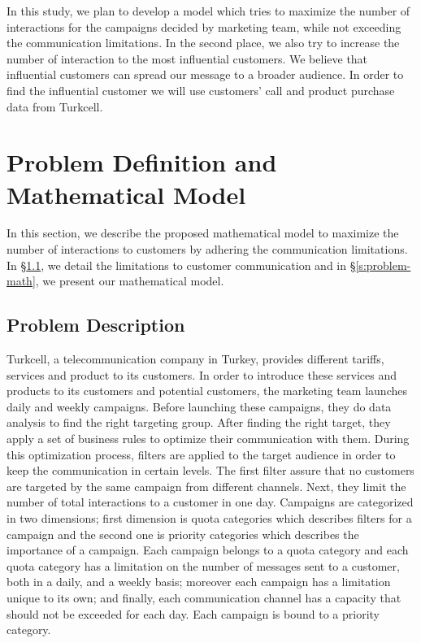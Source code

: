\documentclass[11pt]{article}
\begin{document}
In this study, we plan to develop a model which tries to maximize the number of interactions for the campaigns decided by marketing team, while not exceeding the communication limitations. In the second place, we also try to increase the number of interaction to the most influential customers. We believe that influential customers can spread our message to a broader audience. In order to find the influential customer we will use customers' call and product purchase data from Turkcell.

\section{Problem Definition and Mathematical Model}  \label{s:problem-model}

In this section, we describe the proposed mathematical model to maximize the number of interactions to customers by adhering the communication limitations. In \S \ref{s:problem-desc}, we detail the limitations to customer communication and in \S \ref{s:problem-math}, we present our mathematical model.

\subsection{Problem Description} \label{s:problem-desc}

Turkcell, a telecommunication company in Turkey, provides different tariffs, services and product to its customers. In order to introduce these services and products to its customers and potential customers, the marketing team launches daily and weekly campaigns. Before launching these campaigns, they do data analysis to find the right targeting group. After finding the right target, they apply a set of business rules to optimize their communication with them. During this optimization process, filters are applied to the target audience in order to keep the communication in certain levels. The first filter assure that no customers are targeted by the same campaign from different channels. Next, they limit the number of total interactions to a customer in one day. Campaigns are categorized in two dimensions; first dimension is quota categories which describes filters for a campaign and the second one is priority categories which describes the importance of a campaign. Each campaign belongs to a quota category and each quota category has a limitation on the number of messages sent to a customer, both in a daily, and a weekly basis; moreover each campaign has a limitation unique to its own; and finally, each communication channel has a capacity that should not be exceeded for each day. Each campaign is bound to a priority category.\\
\end{document}
